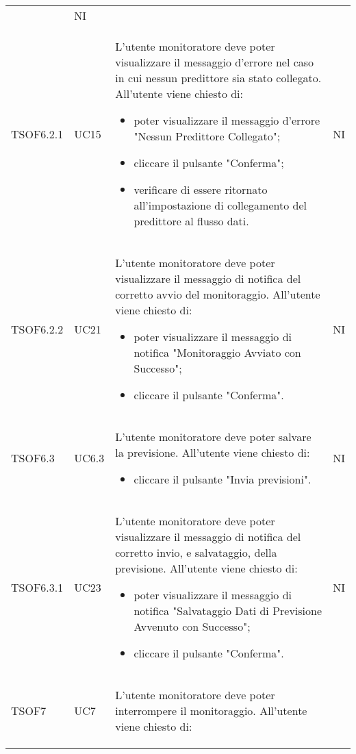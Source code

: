 \begin{longtable}{C{2.5cm} C{2.5cm} L{8cm} C{2cm}}
\begin{itemize}
\end{itemize} & NI \\
TSOF6.2.1 & UC15 & L'utente monitoratore deve poter visualizzare il messaggio d’errore nel caso in cui nessun predittore sia stato collegato. \newline All’utente viene chiesto di:
\begin{itemize}
	\item poter visualizzare il messaggio d’errore "Nessun Predittore Collegato";
	\item cliccare il pulsante "Conferma";
	\item verificare di essere ritornato all’impostazione di collegamento del predittore al flusso dati.
\end{itemize}& NI \\
TSOF6.2.2 & UC21 & L'utente monitoratore deve poter visualizzare il messaggio di notifica del corretto avvio del monitoraggio. \newline All'utente viene chiesto di: 
\begin{itemize}
	\item poter visualizzare il messaggio di notifica "Monitoraggio Avviato con Successo";
	\item cliccare il pulsante "Conferma".
\end{itemize} & NI \\
TSOF6.3 & UC6.3 & L'utente monitoratore deve poter salvare la previsione. \newline All'utente viene chiesto di: \begin{itemize}
\item cliccare il pulsante "Invia previsioni".
\end{itemize} & NI \\
TSOF6.3.1 & UC23 & L'utente monitoratore deve poter visualizzare il messaggio di notifica del corretto invio, e salvataggio, della previsione. \newline All'utente viene chiesto di: 
\begin{itemize}
	\item poter visualizzare il messaggio di notifica "Salvataggio Dati di Previsione Avvenuto con Successo";
	\item cliccare il pulsante "Conferma".
\end{itemize} & NI \\
TSOF7 & UC7 & L'utente monitoratore deve poter interrompere il monitoraggio. \newline All'utente viene chiesto di: \begin{itemize}

\end{itemize}
\end{longtable}

